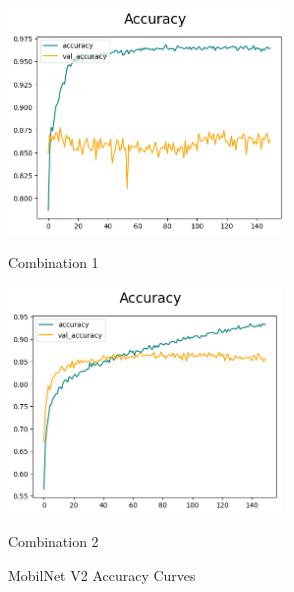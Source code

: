 \begin{figure}[H]
    \centering
    \begin{minipage}[b]{0.49\textwidth}
        \centering
        \includegraphics[width=\textwidth, height=6cm]{Figures/balanced_data/less_data/withoutbn/mn2/accuracy.png}
        \captionsetup{labelformat=empty}
        \caption{Combination 1}
        \label{fig:u_wo_r_a}
    \end{minipage}
    \hfill
    \begin{minipage}[b]{0.49\textwidth}
        \centering
        \includegraphics[width=\textwidth, height=6cm]{Figures/balanced_data/less_data/withbn/mn2/accuracy.png}
        \captionsetup{labelformat=empty}
        \caption{Combination 2}
        \label{fig:u_w_r_a}
    \end{minipage}
    \captionsetup{labelformat=default}
    \caption{MobilNet V2 Accuracy Curves}
\end{figure}



